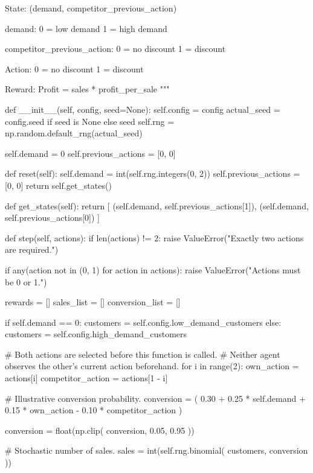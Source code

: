     State:
        (demand, competitor_previous_action)

        demand:
            0 = low demand
            1 = high demand

        competitor_previous_action:
            0 = no discount
            1 = discount

    Action:
        0 = no discount
        1 = discount

    Reward:
        Profit = sales * profit_per_sale
    """

    def __init__(self, config, seed=None):
        self.config = config
        actual_seed = config.seed if seed is None else seed
        self.rng = np.random.default_rng(actual_seed)

        self.demand = 0
        self.previous_actions = [0, 0]

    def reset(self):
        self.demand = int(self.rng.integers(0, 2))
        self.previous_actions = [0, 0]
        return self.get_states()

    def get_states(self):
        return [
            (self.demand, self.previous_actions[1]),
            (self.demand, self.previous_actions[0])
        ]

    def step(self, actions):
        if len(actions) != 2:
            raise ValueError("Exactly two actions are required.")

        if any(action not in (0, 1) for action in actions):
            raise ValueError("Actions must be 0 or 1.")

        rewards = []
        sales_list = []
        conversion_list = []

        if self.demand == 0:
            customers = self.config.low_demand_customers
        else:
            customers = self.config.high_demand_customers

        # Both actions are selected before this function is called.
        # Neither agent observes the other's current action beforehand.
        for i in range(2):
            own_action = actions[i]
            competitor_action = actions[1 - i]

            # Illustrative conversion probability.
            conversion = (
                0.30
                + 0.25 * self.demand
                + 0.15 * own_action
                - 0.10 * competitor_action
            )

            conversion = float(np.clip(
                conversion, 0.05, 0.95
            ))

            # Stochastic number of sales.
            sales = int(self.rng.binomial(
                customers, conversion
            ))

